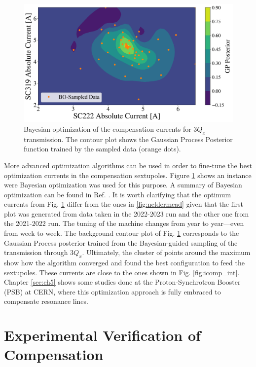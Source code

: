 \begin{figure}[H]
    \centering
    \includegraphics[width=\columnwidth]{chapter4/bo.png}
    \caption{Bayesian optimization of the compensation currents for $3Q_x$ transmission. The contour plot shows the Gaussian Process Posterior function trained by the sampled data (orange dots).}
    \label{fig:boRR}
\end{figure}

More advanced optimization algorithms can be used in order to fine-tune the best optimization currents in the compensation sextupoles. Figure \ref{fig:boRR} shows an instance were Bayesian optimization was used for this purpose. A summary of Bayesian optimization can be found in Ref. \cite{bayesian}. It is worth clarifying that the optimum currents from Fig. \ref{fig:boRR} differ from the ones in \ref{fig:neldermead} given that the first plot was generated from data taken in the 2022-2023 run and the other one from the 2021-2022 run. The tuning of the machine changes from year to year---even from week to week. The background contour plot of Fig. \ref{fig:boRR} corresponds to the Gaussian Process posterior trained from the Bayesian-guided sampling of the transmission through $3Q_x$. Ultimately, the cluster of points around the maximum show how the algorithm converged and found the best configuration to feed the sextupoles. These currents are close to the ones shown in Fig. \ref{fig:icomp_int}. Chapter \ref{sec:ch5} shows some studies done at the Proton-Synchrotron Booster (PSB) at CERN, where this optimization approach is fully embraced to compensate resonance lines.

\section{\label{sec:verify}Experimental Verification of Compensation}

